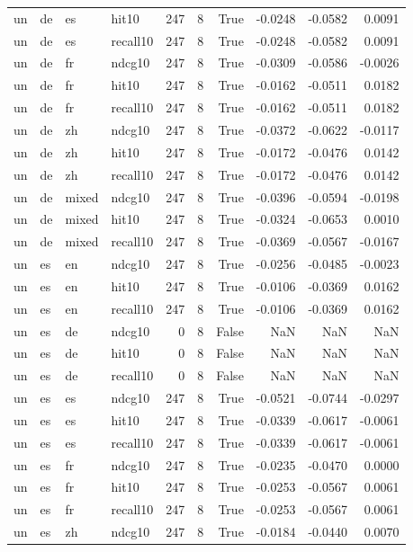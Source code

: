 \begin{tabular}{llllrrrrrr}
un & de & es & hit10 & 247 & 8 & True & -0.0248 & -0.0582 & 0.0091 \\
un & de & es & recall10 & 247 & 8 & True & -0.0248 & -0.0582 & 0.0091 \\
un & de & fr & ndcg10 & 247 & 8 & True & -0.0309 & -0.0586 & -0.0026 \\
un & de & fr & hit10 & 247 & 8 & True & -0.0162 & -0.0511 & 0.0182 \\
un & de & fr & recall10 & 247 & 8 & True & -0.0162 & -0.0511 & 0.0182 \\
un & de & zh & ndcg10 & 247 & 8 & True & -0.0372 & -0.0622 & -0.0117 \\
un & de & zh & hit10 & 247 & 8 & True & -0.0172 & -0.0476 & 0.0142 \\
un & de & zh & recall10 & 247 & 8 & True & -0.0172 & -0.0476 & 0.0142 \\
un & de & mixed & ndcg10 & 247 & 8 & True & -0.0396 & -0.0594 & -0.0198 \\
un & de & mixed & hit10 & 247 & 8 & True & -0.0324 & -0.0653 & 0.0010 \\
un & de & mixed & recall10 & 247 & 8 & True & -0.0369 & -0.0567 & -0.0167 \\
un & es & en & ndcg10 & 247 & 8 & True & -0.0256 & -0.0485 & -0.0023 \\
un & es & en & hit10 & 247 & 8 & True & -0.0106 & -0.0369 & 0.0162 \\
un & es & en & recall10 & 247 & 8 & True & -0.0106 & -0.0369 & 0.0162 \\
un & es & de & ndcg10 & 0 & 8 & False & NaN & NaN & NaN \\
un & es & de & hit10 & 0 & 8 & False & NaN & NaN & NaN \\
un & es & de & recall10 & 0 & 8 & False & NaN & NaN & NaN \\
un & es & es & ndcg10 & 247 & 8 & True & -0.0521 & -0.0744 & -0.0297 \\
un & es & es & hit10 & 247 & 8 & True & -0.0339 & -0.0617 & -0.0061 \\
un & es & es & recall10 & 247 & 8 & True & -0.0339 & -0.0617 & -0.0061 \\
un & es & fr & ndcg10 & 247 & 8 & True & -0.0235 & -0.0470 & 0.0000 \\
un & es & fr & hit10 & 247 & 8 & True & -0.0253 & -0.0567 & 0.0061 \\
un & es & fr & recall10 & 247 & 8 & True & -0.0253 & -0.0567 & 0.0061 \\
un & es & zh & ndcg10 & 247 & 8 & True & -0.0184 & -0.0440 & 0.0070 \\

\end{tabular}
